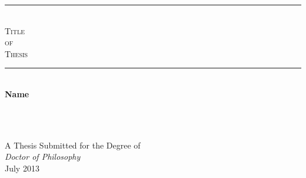 \thispagestyle{empty}

\thispagestyle{empty}
\enlargethispage{3cm}
\vspace*{-2cm}
\hspace*{-2.9cm}
\begin{minipage}[t]{17cm}
	\centering


%
%
%


%


\vspace*{1.5cm}
\rule{\textwidth}{3pt}\\
\vspace*{0.8cm}
{\LARGE\textsc{Title}}\\
{\LARGE\textsc{ of }}\\
{\LARGE\textsc{Thesis}}\\
\vspace*{0.5cm}
\rule{\textwidth}{3pt}\\

\vspace*{1.2cm}
\LARGE{\textbf{Name}}\\
\vspace*{0.3cm}

\vspace*{2.2cm}
\Large{\textbf{}}\\
\normalsize{}\\

\vspace{1cm}
\normalsize

\vspace*{1.5cm}
A Thesis Submitted for the Degree of\\
\textit{Doctor of Philosophy}
\\ July 2013

\vspace*{0.7cm}
\begin{tabular}{lll}

\end{tabular}

\end{minipage}